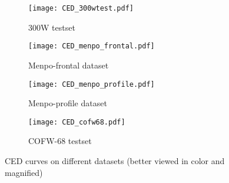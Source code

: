 \documentclass{article}
\begin{document}
  \begin{figure}[ht]
    \begin{subfigure}{0.24\textwidth}
      \begin{center}
       \texttt{[image: CED\_300wtest.pdf]}
      \end{center}
       \caption{300W testset}
      \label{fig:CED_300w}
    \end{subfigure}
    \begin{subfigure}{0.24\textwidth}
      \begin{center}
       \texttt{[image: CED\_menpo\_frontal.pdf]}
      \end{center}
       \caption{Menpo-frontal dataset}
      \label{fig:CED_menpo-frontal}
    \end{subfigure}
    \begin{subfigure}{0.24\textwidth}
      \begin{center}
       \texttt{[image: CED\_menpo\_profile.pdf]}
      \end{center}
       \caption{Menpo-profile dataset}
      \label{fig:CED_menpo-profile}
    \end{subfigure}
    \begin{subfigure}{0.24\textwidth}
      \begin{center}
       \texttt{[image: CED\_cofw68.pdf]}
      \end{center}
       \caption{COFW-68 testset}
      \label{fig:CED_COFW}
    \end{subfigure}
  \caption{CED curves on different datasets (better viewed in color and magnified)}
  \label{fig:CED_300w_menpo_cofw}
  \end{figure} 
\end{document}
